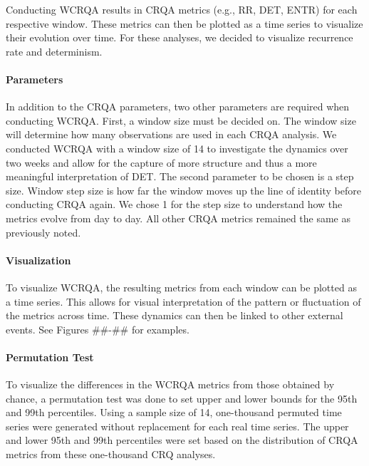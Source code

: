 \documentclass[english,man]{apa6}
\begin{document}
Conducting WCRQA results in CRQA metrics (e.g., RR, DET, ENTR) for each respective window. These metrics can then be plotted as a time series to visualize their evolution over time. For these analyses, we decided to visualize recurrence rate and determinism.

\hypertarget{parameters-1}{%
\paragraph{Parameters}\label{parameters-1}}

In addition to the CRQA parameters, two other parameters are required when conducting WCRQA. First, a window size must be decided on. The window size will determine how many observations are used in each CRQA analysis. We conducted WCRQA with a window size of 14 to investigate the dynamics over two weeks and allow for the capture of more structure and thus a more meaningful interpretation of DET. The second parameter to be chosen is a step size. Window step size is how far the window moves up the line of identity before conducting CRQA again. We chose 1 for the step size to understand how the metrics evolve from day to day. All other CRQA metrics remained the same as previously noted.

\hypertarget{visualization-1}{%
\paragraph{Visualization}\label{visualization-1}}

To visualize WCRQA, the resulting metrics from each window can be plotted as a time series. This allows for visual interpretation of the pattern or fluctuation of the metrics across time. These dynamics can then be linked to other external events. See Figures \#\#-\#\# for examples.

\hypertarget{permutation-test-1}{%
\paragraph{Permutation Test}\label{permutation-test-1}}

To visualize the differences in the WCRQA metrics from those obtained by chance, a permutation test was done to set upper and lower bounds for the 95th and 99th percentiles. Using a sample size of 14, one-thousand permuted time series were generated without replacement for each real time series. The upper and lower 95th and 99th percentiles were set based on the distribution of CRQA metrics from these one-thousand CRQ analyses.
\end{document}
